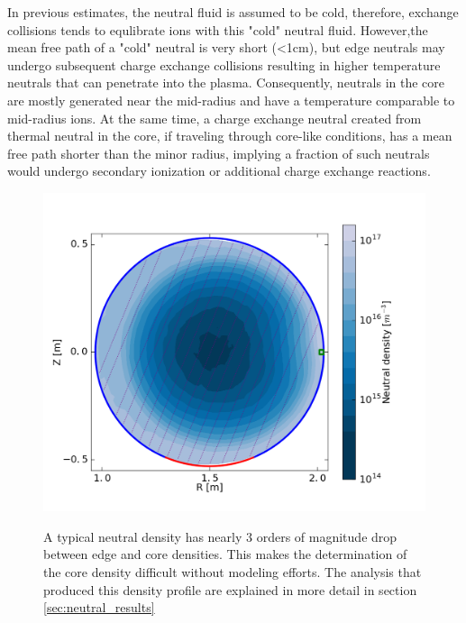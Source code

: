 \begin{refsection}
In previous estimates, the neutral fluid is assumed to be cold, therefore, exchange collisions tends to equlibrate ions with this "cold" neutral fluid. However,the mean free path of a "cold" neutral is
very short (<1cm), but edge neutrals may undergo subsequent charge exchange collisions resulting in higher temperature neutrals that can penetrate into the plasma. Consequently, neutrals in the core are mostly generated near the mid-radius and have a temperature comparable to mid-radius ions. At the same time, a charge exchange neutral created from thermal neutral in the core, if traveling through core-like conditions, has a mean free path
shorter than the minor radius, implying a fraction of such neutrals would undergo secondary ionization or additional charge exchange reactions. 

\begin{figure}[!htb]
	\centering
	\includegraphics{./transport_modeling/neutral_n.png}
    \label{fig:n_n_0}
    \caption[Typical neutral density profile]{A typical neutral density has nearly 3 orders of magnitude drop between edge and core densities. This makes the determination of the core density difficult without modeling efforts. The analysis that produced this density profile are explained in more detail in section \ref{sec:neutral_results}}
\end{figure}%


\end{refsection}
